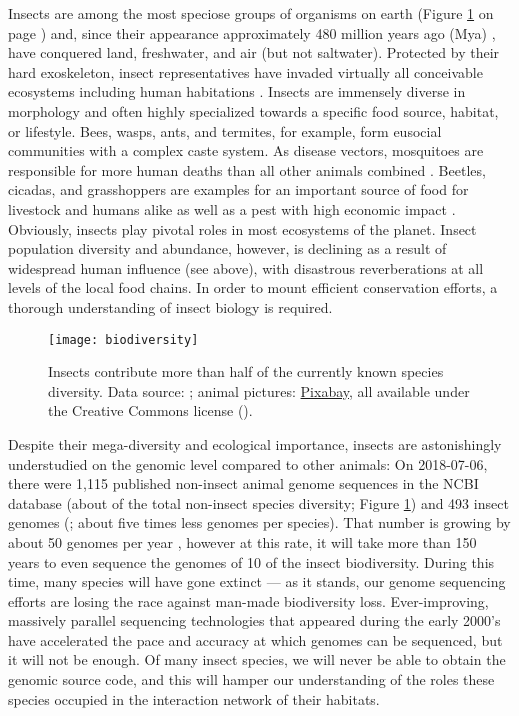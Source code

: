 Insects are among the most speciose groups of organisms on earth (Figure
\ref{fig:biodiversity} on page \pageref{fig:biodiversity}) and, since
their appearance approximately 480 million years ago (Mya)
\citep{Misof2014}, have conquered land, freshwater, and air (but not
saltwater). Protected by their hard exoskeleton, insect representatives
have invaded virtually all conceivable ecosystems including human
habitations \citep{Bertone2016}.  Insects are immensely diverse in
morphology \citep{Grimaldi2005} and often highly specialized towards a
specific food source, habitat, or lifestyle. Bees, wasps, ants, and
termites, for example, form eusocial communities with a complex caste
system. As disease vectors, mosquitoes are responsible for more human
deaths than all other animals combined \citep{WHO2017, Linnell2011,
Lamarque2009, DeMaddalena2008, Kasturiratne2008, Packer2005}. Beetles,
cicadas, and grasshoppers are examples for an important source of food
for livestock and humans alike as well as a pest with high economic
impact \citep{Oliveira2014}. Obviously, insects play pivotal roles in
most ecosystems of the planet. Insect population diversity and
abundance, however, is declining \citep{Vogel2017} as a result of
widespread human influence (see above), with disastrous reverberations
at all levels of the local food chains.  In order to mount efficient
conservation efforts, a thorough understanding of insect biology is
required.

\begin{figure}
\centering
\texttt{[image: biodiversity]}
\caption[Biodiversity by numbers of species]
{Insects contribute more than half of the currently known species
diversity. Data source: \citet{IUCN2018}; animal pictures:
\href{https://pixabay.com}{Pixabay}, all available under the Creative
Commons license (\ccZero).}
\label{fig:biodiversity}
\end{figure}

Despite their mega-diversity and ecological importance, insects are
astonishingly understudied on the genomic level compared to other
animals: On 2018-07-06, there were 1,115 published non-insect animal
genome sequences in the NCBI database \citep{OLeary2016} (about 
of the total non-insect species diversity; Figure
\ref{fig:biodiversity}) and 493 insect genomes (; about five
times less genomes per species).  That number is growing by about 50
genomes per year \citep{OLeary2016}, however at this rate, it will take
more than 150 years to even sequence the genomes of 10 of the insect
biodiversity.  During this time, many species will have gone extinct ---
as it stands, our genome sequencing efforts are losing the race against
man-made biodiversity loss. Ever-improving, massively parallel
sequencing technologies that appeared during the early 2000's
\citep{Behjati2013} have accelerated the pace and accuracy at which
genomes can be sequenced, but it will not be enough. Of many insect
species, we will never be able to obtain the genomic source code, and
this will hamper our understanding of the roles these species occupied
in the interaction network of their habitats.

